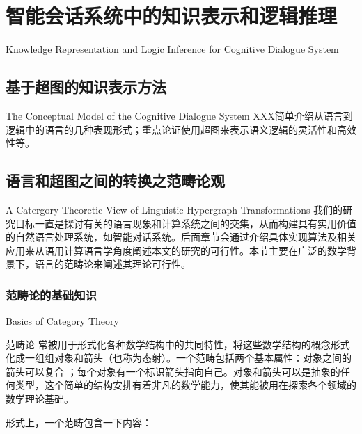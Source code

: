 \chapter{智能会话系统中的知识表示和逻辑推理}{Knowledge Representation and Logic Inference for Cognitive Dialogue System}
\label{chap:representation}

\section{基于超图的知识表示方法}{The Conceptual Model of the Cognitive Dialogue System}
XXX简单介绍从语言到逻辑中的语言的几种表现形式；重点论证使用超图来表示语义逻辑的灵活性和高效性等。




\section{语言和超图之间的转换之范畴论观}{A Catergory-Theoretic View of Linguistic Hypergraph Transformations}
我们的研究目标一直是探讨有关的语言现象和计算系统之间的交集，从而构建具有实用价值的自然语言处理系统，如智能对话系统。后面章节会通过介绍具体实现算法及相关应用来从语用计算语言学角度阐述本文的研究的可行性。本节主要在广泛的数学背景下，语言的范畴论来阐述其理论可行性。

\subsection{范畴论的基础知识}{Basics of Category Theory}

范畴论 \cite{LawvereSchanuel97}常被用于形式化各种数学结构中的共同特性，将这些数学结构的概念形式化成一组组对象和箭头（也称为态射）。一个范畴包括两个基本属性：对象之间的箭头可以复合 ；每个对象有一个标识箭头指向自己。对象和箭头可以是抽象的任何类型，这个简单的结构安排有着非凡的数学能力，使其能被用在探索各个领域的数学理论基础。

形式上，一个范畴包含一下内容：

